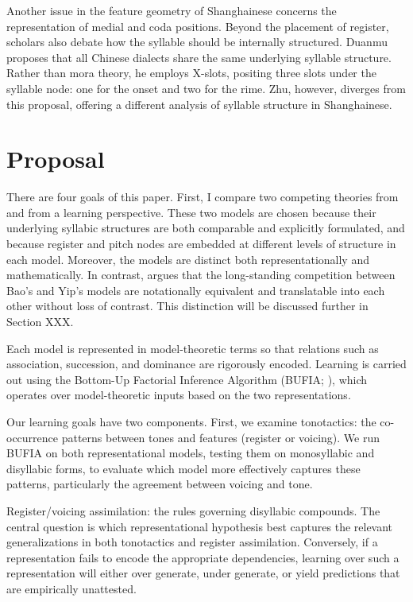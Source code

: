 \documentclass[11pt]{article}
\begin{document}
Another issue in the feature geometry of Shanghainese concerns the 
representation of medial and coda positions. Beyond the placement of register, 
scholars also debate how the syllable should be internally structured. Duanmu 
proposes that all Chinese dialects share the same underlying syllable 
structure. Rather than mora theory, he employs X-slots, positing three slots 
under the syllable node: one for the onset and two for the rime. Zhu, however, 
diverges from this proposal, offering a different analysis of syllable 
structure in Shanghainese.

\section{Proposal}
There are four goals of this paper. First, I compare two competing theories 
from \citet{duanmu1988} and \citet{zhu1999shanghai} from a learning
perspective.
These two models are chosen because their underlying syllabic structures are 
both comparable and explicitly formulated, and because register and pitch nodes 
are embedded at different levels of structure in each model. Moreover, the
models
are distinct both representationally and mathematically. In contrast, 
\citet{oakdenNotationalEquivalenceTonal2020} argues that the long-standing
competition
between Bao’s and Yip’s models are notationally equivalent and translatable
into each
other without loss of contrast. This distinction will be discussed further in
Section XXX.

Each model is represented in model-theoretic terms so that relations such as
association,
succession, and dominance are rigorously encoded. Learning is carried out using
the Bottom-Up
Factorial Inference Algorithm (BUFIA; \citet{chandleeBufia2019}), which
operates over model-theoretic
inputs based on the two representations.

Our learning goals have two components. First, we examine tonotactics: the
co-occurrence
patterns between tones and features (register or voicing). We run BUFIA on both
representational models, testing them on monosyllabic and disyllabic forms, to
evaluate which model more effectively captures these patterns, particularly the
agreement between voicing and tone.

Register/voicing assimilation: the rules governing disyllabic compounds.
The central question is which representational hypothesis best captures the
relevant generalizations in both tonotactics and register assimilation.
Conversely, if a representation fails to encode the appropriate dependencies,
learning over such a representation will either over generate, under generate,
or yield predictions that are empirically unattested.
\end{document}
